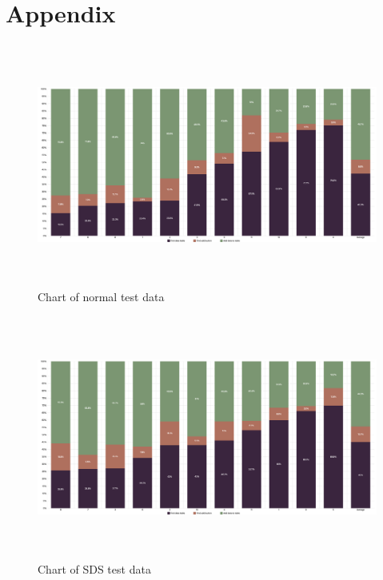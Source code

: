 \section*{Appendix}
\begin{figure}
    \centerline{
    \includegraphics[height=8cm]{images/normal_test_data_chart.png}}
\caption{Chart of normal test data}
\end{figure}
\begin{figure}
    \centerline{
    \includegraphics[height=8cm]{images/sds_test_data_chart.png}}
\caption{Chart of \ac{SDS} test data}
\end{figure}
